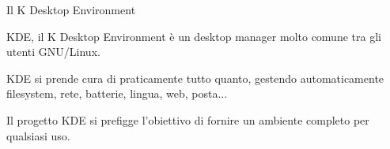\begin{slide}{Il K Desktop Environment}
{\small
KDE, il K Desktop Environment è un desktop manager molto comune tra gli
utenti GNU/Linux.

KDE si prende cura di praticamente tutto quanto, gestendo
automaticamente filesystem, rete, batterie, lingua, web, posta...

Il progetto KDE si prefigge l'obiettivo di fornire un ambiente completo
per qualsiasi uso.
}



\end{slide}
